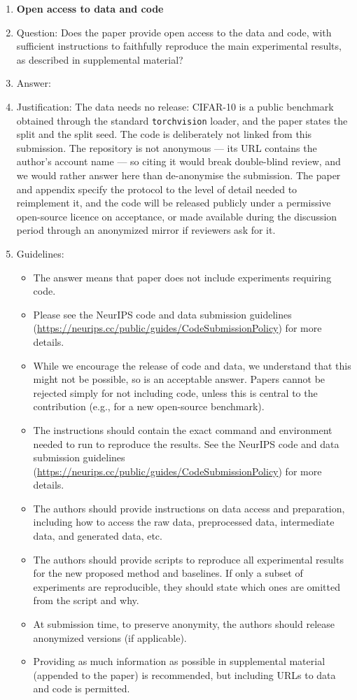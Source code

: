 \begin{enumerate}
\item {\bf Open access to data and code}
    \item[] Question: Does the paper provide open access to the data and code, with sufficient instructions to faithfully reproduce the main experimental results, as described in supplemental material?
    \item[] Answer: \answerNo{}
    \item[] Justification: The data needs no release: CIFAR-10 is a public benchmark obtained through the standard \texttt{torchvision} loader, and the paper states the split and the split seed. The code is deliberately not linked from this submission. The repository is not anonymous --- its URL contains the author's account name --- so citing it would break double-blind review, and we would rather answer \answerNo{} here than de-anonymise the submission. The paper and appendix specify the protocol to the level of detail needed to reimplement it, and the code will be released publicly under a permissive open-source licence on acceptance, or made available during the discussion period through an anonymized mirror if reviewers ask for it.
    \item[] Guidelines:
    \begin{itemize}
        \item The answer \answerNA{} means that paper does not include experiments requiring code.
        \item Please see the NeurIPS code and data submission guidelines (\url{https://neurips.cc/public/guides/CodeSubmissionPolicy}) for more details.
        \item While we encourage the release of code and data, we understand that this might not be possible, so \answerNo{} is an acceptable answer. Papers cannot be rejected simply for not including code, unless this is central to the contribution (e.g., for a new open-source benchmark).
        \item The instructions should contain the exact command and environment needed to run to reproduce the results. See the NeurIPS code and data submission guidelines (\url{https://neurips.cc/public/guides/CodeSubmissionPolicy}) for more details.
        \item The authors should provide instructions on data access and preparation, including how to access the raw data, preprocessed data, intermediate data, and generated data, etc.
        \item The authors should provide scripts to reproduce all experimental results for the new proposed method and baselines. If only a subset of experiments are reproducible, they should state which ones are omitted from the script and why.
        \item At submission time, to preserve anonymity, the authors should release anonymized versions (if applicable).
        \item Providing as much information as possible in supplemental material (appended to the paper) is recommended, but including URLs to data and code is permitted.
    \end{itemize}



\end{enumerate}
